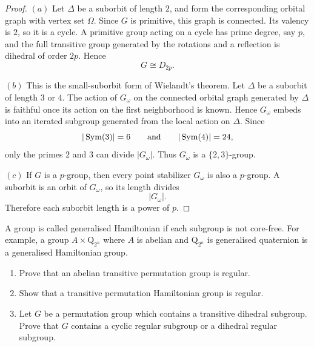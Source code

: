 \begin{proof}
\((a)\) Let \(\Delta\) be a suborbit of length \(2\), and form the corresponding
orbital graph with vertex set \(\Omega\). Since \(G\) is primitive, this graph
is connected. Its valency is \(2\), so it is a cycle. A primitive group acting
on a cycle has prime degree, say \(p\), and the full transitive group generated
by the rotations and a reflection is dihedral of order \(2p\). Hence
\[
    G\cong D_{2p}.
\]

\((b)\) This is the small-suborbit form of Wielandt's theorem. Let \(\Delta\) be
a suborbit of length \(3\) or \(4\). The action of \(G_\omega\) on the connected
orbital graph generated by \(\Delta\) is faithful once its action on the first
neighborhood is known. Hence \(G_\omega\) embeds into an iterated subgroup
generated from the local action on \(\Delta\). Since
\[
    |\operatorname{Sym}(3)|=6
    \qquad\text{and}\qquad
    |\operatorname{Sym}(4)|=24,
\]
only the primes \(2\) and \(3\) can divide \(|G_\omega|\). Thus \(G_\omega\) is
a \(\{2,3\}\)-group.

\((c)\) If \(G\) is a \(p\)-group, then every point stabilizer \(G_\omega\) is
also a \(p\)-group. A suborbit is an orbit of \(G_\omega\), so its length divides
\[
    |G_\omega|.
\]
Therefore each suborbit length is a power of \(p\).
\end{proof}

\begin{exercise}
A group is called generalised Hamiltonian if each subgroup is not core-free. For
example, a group \(A \times \mathrm{Q}_{2^n}\) where \(A\) is abelian and
\(\mathrm{Q}_{2^n}\) is generalised quaternion is a generalised Hamiltonian
group.
\begin{enumerate}[label=(\alph*)]
    \item Prove that an abelian transitive permutation group is regular.
    \item Show that a transitive permutation Hamiltonian group is regular.
    \item Let \(G\) be a permutation group which contains a transitive dihedral
    subgroup. Prove that \(G\) contains a cyclic regular subgroup or a dihedral
    regular subgroup.
\end{enumerate}
\end{exercise}

